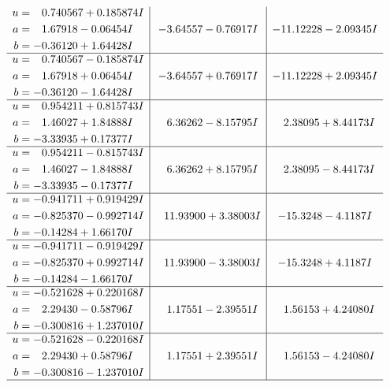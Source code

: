 \documentclass[1p]{elsarticle_modified}
\theoremstyle{definition}
\begin{document}
$$\begin{array}{c|c|c}
\begin{aligned}
u &= \phantom{-}0.740567 + 0.185874 I \\
a &= \phantom{-}1.67918 - 0.06454 I \\
b &= -0.36120 + 1.64428 I\end{aligned}
 & -3.64557 - 0.76917 I & -11.12228 - 2.09345 I \\ \hline\begin{aligned}
u &= \phantom{-}0.740567 - 0.185874 I \\
a &= \phantom{-}1.67918 + 0.06454 I \\
b &= -0.36120 - 1.64428 I\end{aligned}
 & -3.64557 + 0.76917 I & -11.12228 + 2.09345 I \\ \hline\begin{aligned}
u &= \phantom{-}0.954211 + 0.815743 I \\
a &= \phantom{-}1.46027 + 1.84888 I \\
b &= -3.33935 + 0.17377 I\end{aligned}
 & \phantom{-}6.36262 - 8.15795 I & \phantom{-}2.38095 + 8.44173 I \\ \hline\begin{aligned}
u &= \phantom{-}0.954211 - 0.815743 I \\
a &= \phantom{-}1.46027 - 1.84888 I \\
b &= -3.33935 - 0.17377 I\end{aligned}
 & \phantom{-}6.36262 + 8.15795 I & \phantom{-}2.38095 - 8.44173 I \\ \hline\begin{aligned}
u &= -0.941711 + 0.919429 I \\
a &= -0.825370 - 0.992714 I \\
b &= -0.14284 + 1.66170 I\end{aligned}
 & \phantom{-}11.93900 + 3.38003 I & -15.3248 - 4.1187 I \\ \hline\begin{aligned}
u &= -0.941711 - 0.919429 I \\
a &= -0.825370 + 0.992714 I \\
b &= -0.14284 - 1.66170 I\end{aligned}
 & \phantom{-}11.93900 - 3.38003 I & -15.3248 + 4.1187 I \\ \hline\begin{aligned}
u &= -0.521628 + 0.220168 I \\
a &= \phantom{-}2.29430 - 0.58796 I \\
b &= -0.300816 + 1.237010 I\end{aligned}
 & \phantom{-}1.17551 - 2.39551 I & \phantom{-}1.56153 + 4.24080 I \\ \hline\begin{aligned}
u &= -0.521628 - 0.220168 I \\
a &= \phantom{-}2.29430 + 0.58796 I \\
b &= -0.300816 - 1.237010 I\end{aligned}
 & \phantom{-}1.17551 + 2.39551 I & \phantom{-}1.56153 - 4.24080 I\\
 \hline 
 \end{array}$$\newpage
\end{document}
